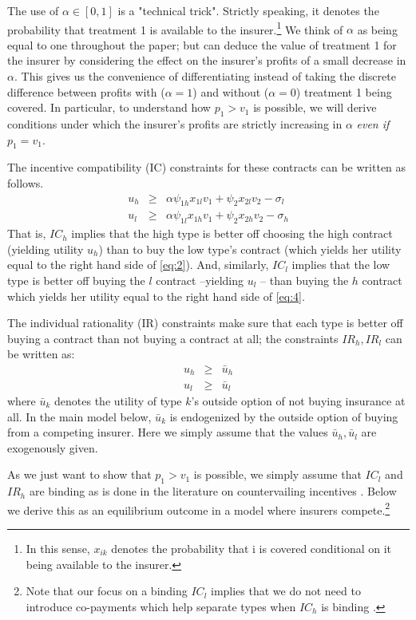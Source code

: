 \documentclass[12pt,english,a4paper]{article}
\begin{document}
The use of \(\alpha \in [0,1]\) is a "technical trick". Strictly speaking, it denotes the probability that treatment 1 is available to the insurer.\footnote{In this sense, \(x_{ik}\) denotes the probability that i is covered conditional on it being available to the insurer.} We think of \(\alpha\) as being equal to one throughout the paper; but can deduce the value of treatment 1 for the insurer by considering the effect on the insurer's profits of a small decrease in \(\alpha\). This gives us the convenience of differentiating instead of taking the discrete difference between profits with (\(\alpha=1\)) and without (\(\alpha=0\)) treatment 1 being covered. In particular, to understand how \(p_1 > v_1\) is possible, we will derive conditions under which the insurer's profits are strictly increasing in \(\alpha\) \emph{even if} \(p_1 = v_1\).

The incentive compatibility (IC) constraints for these contracts can be written as follows.
\begin{eqnarray}
\label{eq:2}
u_h &\geq&  \alpha \psi_{1h} x_{1l} v_1 + \psi_{2} x_{2l} v_2 - \sigma_{l} \\
\label{eq:4}
u_l &\geq&   \alpha \psi_{1l} x_{1h} v_1 + \psi_{2} x_{2h} v_2 - \sigma_h
\end{eqnarray}
That is, \(IC_h\) implies that the high type is better off choosing the high contract (yielding utility \(u_h\)) than to buy the low type's contract (which yields her utility equal to the right hand side of \eqref{eq:2}). And, similarly, \(IC_l\) implies that the low type is better off buying the \(l\) contract --yielding \(u_l\) -- than buying the \(h\) contract which yields her utility equal to the right hand side of \eqref{eq:4}.

The individual rationality (IR) constraints make sure that each type is better off buying a contract than not buying a contract at all; the constraints \(IR_h, IR_l\) can be written as:
\begin{eqnarray}
\label{eq:2IR}
u_h &\geq&  \bar u_h \\
\label{eq:4IR}
u_l &\geq&  \bar u_l
\end{eqnarray}
where \(\bar u_k\) denotes the utility of type \(k\)'s outside option of not buying insurance at all. In the main model below, \(\bar u_k\) is endogenized by the outside option of buying from a competing insurer. Here we simply assume that the values \(\bar u_h, \bar u_l\) are exogenously given.

As we just want to show that \(p_1 > v_1\) is possible, we simply assume that \(IC_l\) and \(IR_h\) are binding as is done in the literature on countervailing incentives \citep{LEWIS1989294}. Below we derive this as an equilibrium outcome in a model where insurers compete.\footnote{Note that our focus on a binding \(IC_l\) implies that we do not need to introduce co-payments which help separate types when \(IC_h\) is binding \citep{rot76}.}
\end{document}
